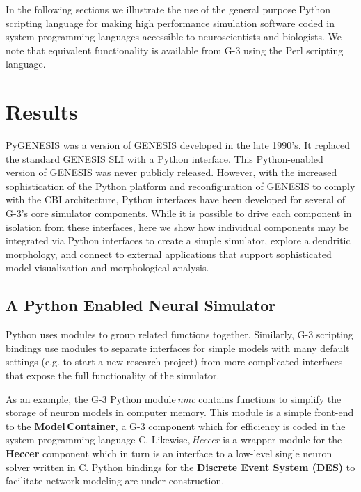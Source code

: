 \documentclass[10pt]{article}
\begin{document}
In the following sections we illustrate the use of the general purpose Python scripting
language for making high performance simulation software coded in
system programming languages accessible to neuroscientists and
biologists. We note that equivalent functionality is available from G-3 using the Perl scripting language. 

\section*{Results}

PyGENESIS was a version of GENESIS developed
in the late 1990's. It replaced the standard GENESIS SLI with a Python
interface. This Python-enabled version of GENESIS was never publicly
released.  However, with the increased sophistication of the Python
platform and reconfiguration of GENESIS to comply with the CBI
architecture, Python interfaces have been developed for several of
G-3's core simulator components.  While it is possible to drive each
component in isolation from these interfaces, here we show how
individual components may be integrated via Python interfaces to
create a simple simulator, explore a dendritic morphology, and connect
to external applications that support sophisticated model
visualization and morphological analysis.

\subsection*{A Python Enabled Neural Simulator}
\label{ss-apens}

Python uses modules to group related functions together.
Similarly, G-3 scripting bindings use modules to separate interfaces for
simple models with many default settings (e.g. to start a new research
project) from more complicated interfaces that expose the full
functionality of the simulator.

As an example, the G-3 Python module\,{\it nmc} contains functions to
simplify the storage of neuron models in computer memory.  This module
is a simple front-end to the {\bf Model\,Container}, a G-3 component
which for efficiency is coded in the system programming language C.
Likewise,\,{\it Heccer} is a wrapper module for the {\bf Heccer}
component which in turn is an interface to a low-level single neuron
solver written in C.  Python bindings for the {\bf Discrete Event
  System (DES)} to facilitate network modeling are under construction.
\end{document}
